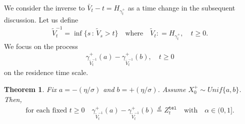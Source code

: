 \documentclass[10pt,a4paper]{article}
\numberwithin{equation}{section}
\theoremstyle{plain}
\newtheorem{theorem}{Theorem}
\theoremstyle{remark}
\begin{document}
We consider the inverse to $\bar{V}_t - t = H_{\gamma^+_t}$ as a time change in the subsequent discussion. Let us define
\begin{align*}
\tilde{V}^{-1}_t = \inf\{s\,:\, \tilde{V}_s>t\} \quad \textrm{where} \quad \tilde{V}_t : = H_{\gamma^+_t}, \quad t \geq 0.
\end{align*}
We focus on the process
\begin{align*}
\gamma^+_{\tilde{V}^{-1}_t}(a) - \gamma^+_{\tilde{V}^{-1}_t} (b), \quad t\geq 0
\end{align*}
on the residence time scale.


\begin{theorem}
Fix $a = -(\eta/\sigma)$ and $b=+(\eta/\sigma)$. Assume $X^+_0 \sim Unif\{a,b\}$.  Then, 
\begin{align*}
\textrm{for each fixed $t\geq 0$} \quad  \gamma^+_{\tilde{V}^{-1}_t}(a) - \gamma^+_{\tilde{V}^{-1}_t} (b) \stackrel{d}{=} Z^\mathtt{tel}_t  \quad \textrm{with} \quad \alpha \in (0,1].
\end{align*}
\label{thm:difALPHA}
\end{theorem}
\end{document}
